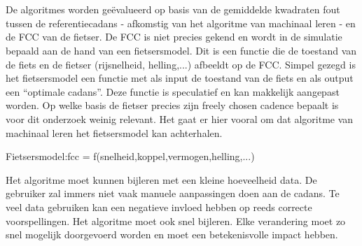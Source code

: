 \\\\
De algoritmes worden geëvalueerd op basis van de gemiddelde kwadraten fout tussen de referentiecadans - afkomstig van het algoritme van machinaal leren - en de FCC van de fietser. De FCC is niet precies gekend en wordt in de simulatie bepaald aan de hand van een fietsersmodel. Dit is een functie die de toestand van de fiets en de fietser (rijsnelheid, helling,...) afbeeldt op de FCC. Simpel gezegd is het fietsersmodel een functie met als input de toestand van de fiets en als output een “optimale cadans”. Deze functie is speculatief en kan makkelijk aangepast worden. Op welke basis de fietser precies zijn freely chosen cadence bepaalt is voor dit onderzoek weinig relevant. Het gaat er hier vooral om dat algoritme van machinaal leren het fietsersmodel kan achterhalen.
\\
\begin{center}
Fietsersmodel:\tab fcc = f(snelheid,koppel,vermogen,helling,...)
\end{center}
Het algoritme moet kunnen bijleren met een kleine hoeveelheid data. De gebruiker zal immers niet vaak manuele aanpassingen doen aan de cadans. Te veel data gebruiken kan een negatieve invloed hebben op reeds correcte voorspellingen. Het algoritme moet ook snel bijleren. Elke verandering moet zo snel mogelijk doorgevoerd worden en moet een betekenisvolle impact hebben.
